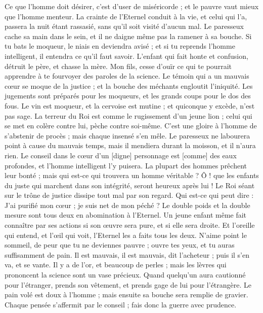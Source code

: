 \begin{multicols}{2}
Ce que l'homme doit désirer, c'est d'user de miséricorde ; et le pauvre vaut mieux que l'homme menteur.
La crainte de l'Eternel conduit à la vie, et celui qui l'a, passera la nuit étant rassasié, sans qu'il soit visité d'aucun mal.
Le paresseux cache sa main dans le sein, et il ne daigne même pas la ramener à sa bouche.
Si tu bats le moqueur, le niais en deviendra avisé ; et si tu reprends l'homme intelligent, il entendra ce qu'il faut savoir.
L'enfant qui fait honte et confusion, détruit le père, et chasse la mère.
Mon fils, cesse d'ouïr ce qui te pourrait apprendre à te fourvoyer des paroles de la science.
Le témoin qui a un mauvais cœur se moque de la justice ; et la bouche des méchants engloutit l'iniquité.
Les jugements sont préparés pour les moqueurs, et les grands coups pour le dos des fous.
\VerseOne{}Le vin est moqueur, et la cervoise est mutine ; et quiconque y excède, n'est pas sage.
La terreur du Roi est comme le rugissement d'un jeune lion ; celui qui se met en colère contre lui, pèche contre soi-même.
C'est une gloire à l'homme de s'abstenir de procès ; mais chaque insensé s'en mêle.
Le paresseux ne labourera point à cause du mauvais temps, mais il mendiera durant la moisson, et il n'aura rien.
Le conseil dans le cœur d'un [digne] personnage est [comme] des eaux profondes, et l'homme intelligent l'y puisera.
La plupart des hommes prêchent leur bonté ; mais qui est-ce qui trouvera un homme véritable ?
Ô ! que les enfants du juste qui marchent dans son intégrité, seront heureux après lui !
Le Roi séant sur le trône de justice dissipe tout mal par son regard.
Qui est-ce qui peut dire : J'ai purifié mon cœur ; je suis net de mon péché ?
Le double poids et la double mesure sont tous deux en abomination à l'Eternel.
Un jeune enfant même fait connaître par ses actions si son œuvre sera pure, et si elle sera droite.
Et l'oreille qui entend, et l'œil qui voit, l'Eternel les a faits tous les deux.
N'aime point le sommeil, de peur que tu ne deviennes pauvre ; ouvre tes yeux, et tu auras suffisamment de pain.
Il est mauvais, il est mauvais, dit l'acheteur ; puis il s'en va, et se vante.
Il y a de l'or, et beaucoup de perles ; mais les lèvres qui prononcent la science sont un vase précieux.
Quand quelqu'un aura cautionné pour l'étranger, prends son vêtement, et prends gage de lui pour l'étrangère.
Le pain volé est doux à l'homme ; mais ensuite sa bouche sera remplie de gravier.
Chaque pensée s'affermit par le conseil ; fais donc la guerre avec prudence.

\end{multicols}
